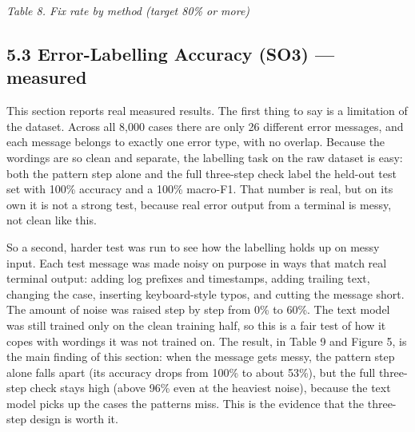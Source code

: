 \documentclass[
]{article}
\begin{document}
\emph{Table 8. Fix rate by method (target 80\% or more)}

\hypertarget{error-labelling-accuracy-so3-measured}{%
\subsection{5.3 Error-Labelling Accuracy (SO3) ---
measured}\label{error-labelling-accuracy-so3-measured}}

This section reports real measured results. The first thing to say is a
limitation of the dataset. Across all 8,000 cases there are only 26
different error messages, and each message belongs to exactly one error
type, with no overlap. Because the wordings are so clean and separate,
the labelling task on the raw dataset is easy: both the pattern step
alone and the full three-step check label the held-out test set with
100\% accuracy and a 100\% macro-F1. That number is real, but on its own
it is not a strong test, because real error output from a terminal is
messy, not clean like this.

So a second, harder test was run to see how the labelling holds up on
messy input. Each test message was made noisy on purpose in ways that
match real terminal output: adding log prefixes and timestamps, adding
trailing text, changing the case, inserting keyboard-style typos, and
cutting the message short. The amount of noise was raised step by step
from 0\% to 60\%. The text model was still trained only on the clean
training half, so this is a fair test of how it copes with wordings it
was not trained on. The result, in Table 9 and Figure 5, is the main
finding of this section: when the message gets messy, the pattern step
alone falls apart (its accuracy drops from 100\% to about 53\%), but the
full three-step check stays high (above 96\% even at the heaviest
noise), because the text model picks up the cases the patterns miss.
This is the evidence that the three-step design is worth it.
\end{document}
